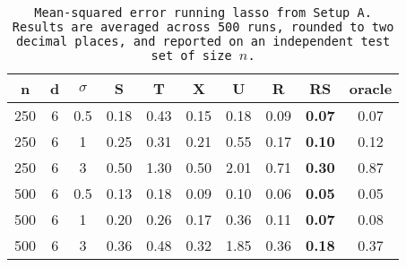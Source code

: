 \begin{table}[ht]
\centering
\begin{tabular}{cccccccccc}
  \hline
n & d & $\sigma$ & S & T & X & U & R & RS & oracle \\ 
  \hline
250 & 6 & 0.5 & 0.18 & 0.43 & 0.15 & 0.18 & 0.09 & \bf 0.07 & 0.07 \\ 
  250 & 6 & 1 & 0.25 & 0.31 & 0.21 & 0.55 & 0.17 & \bf 0.10 & 0.12 \\ 
  250 & 6 & 3 & 0.50 & 1.30 & 0.50 & 2.01 & 0.71 & \bf 0.30 & 0.87 \\ 
  500 & 6 & 0.5 & 0.13 & 0.18 & 0.09 & 0.10 & 0.06 & \bf 0.05 & 0.05 \\ 
  500 & 6 & 1 & 0.20 & 0.26 & 0.17 & 0.36 & 0.11 & \bf 0.07 & 0.08 \\ 
  500 & 6 & 3 & 0.36 & 0.48 & 0.32 & 1.85 & 0.36 & \bf 0.18 & 0.37 \\ 
   \hline
\end{tabular}
\caption{\tt Mean-squared error running \texttt{lasso} from Setup A. Results are averaged across 500 runs, rounded to two decimal places, and reported on an independent test set of size $n$.} 
\label{table:setup1}
\end{table}
